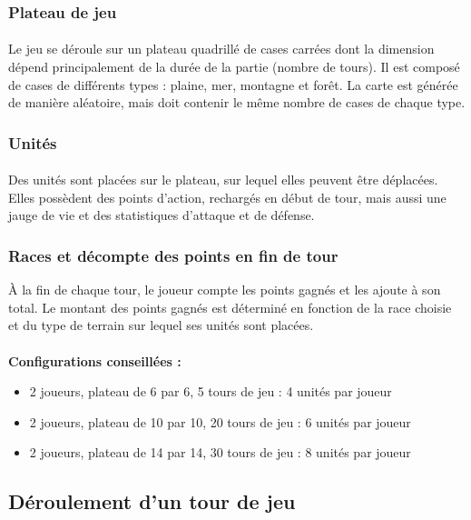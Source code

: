 \documentclass[a4paper]{article}
\begin{document}
\subsubsection{Plateau de jeu}
\paragraph{}
Le jeu se déroule sur un plateau quadrillé de cases carrées dont la dimension dépend principalement de la durée de la partie (nombre de tours).\label{map_gen} Il est composé de cases de différents types : plaine, mer, montagne et forêt. La carte est générée de manière aléatoire, mais doit contenir le même nombre de cases de chaque type.

\subsubsection{Unités}
\paragraph{}
Des unités sont placées sur le plateau, sur lequel elles peuvent être déplacées. Elles possèdent des points d'action, rechargés en début de tour, mais aussi une jauge de vie et des statistiques d'attaque et de défense.

\subsubsection{Races et décompte des points en fin de tour}
À la fin de chaque tour, le joueur compte les points gagnés et les ajoute à son total. Le montant des points gagnés est déterminé en fonction de la race choisie et du type de terrain sur lequel ses unités sont placées.

\paragraph{}
\textbf{Configurations conseillées :}
\begin{itemize}
    \item 2 joueurs, plateau de 6 par 6, 5 tours de jeu : 4 unités par joueur
    \item 2 joueurs, plateau de 10 par 10, 20 tours de jeu : 6 unités par joueur
    \item 2 joueurs, plateau de 14 par 14, 30 tours de jeu : 8 unités par joueur
\end{itemize}

\subsection{Déroulement d'un tour de jeu}
\end{document}
